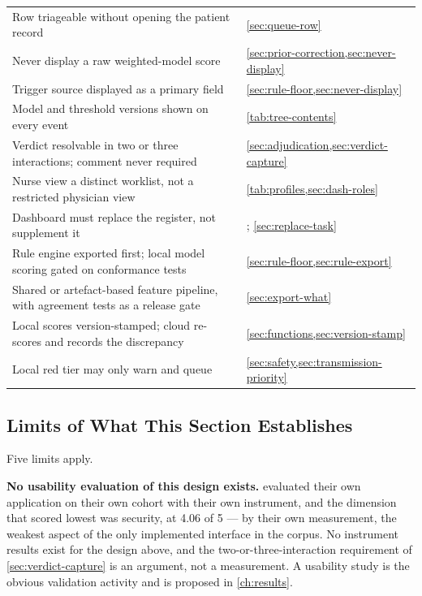 \documentclass[12pt,a4paper,oneside]{report}
\begin{document}
\begin{table}[htbp]
\begin{tabularx}{\textwidth}{@{}X >{\raggedright\arraybackslash}p{4.8cm}@{}}
Row triageable without opening the patient record & \cref{sec:queue-row} \\
Never display a raw weighted-model score & \cref{sec:prior-correction,sec:never-display} \\
Trigger source displayed as a primary field & \cref{sec:rule-floor,sec:never-display} \\
Model and threshold versions shown on every event & \cref{tab:tree-contents} \\
Verdict resolvable in two or three interactions; comment never required & \cref{sec:adjudication,sec:verdict-capture} \\
Nurse view a distinct worklist, not a restricted physician view & \cref{tab:profiles,sec:dash-roles} \\
Dashboard must replace the register, not supplement it & \textcite{dodoo2022}; \cref{sec:replace-task} \\
Rule engine exported first; local model scoring gated on conformance tests & \cref{sec:rule-floor,sec:rule-export} \\
Shared or artefact-based feature pipeline, with agreement tests as a release gate & \cref{sec:export-what} \\
Local scores version-stamped; cloud re-scores and records the discrepancy & \cref{sec:functions,sec:version-stamp} \\
Local red tier may only warn and queue & \cref{sec:safety,sec:transmission-priority} \\
\bottomrule
\end{tabularx}
\end{table}

\subsection{Limits of What This Section Establishes}\label{sec:interface-limits}

Five limits apply.

\textbf{No usability evaluation of this design exists.} \Textcite{efendi2025} evaluated their own application on their own cohort with their own instrument, and the dimension that scored lowest was security, at 4.06 of 5 --- by their own measurement, the weakest aspect of the only implemented interface in the corpus. No instrument results exist for the design above, and the two-or-three-interaction requirement of \cref{sec:verdict-capture} is an argument, not a measurement. A usability study is the obvious validation activity and is proposed in \cref{ch:results}.
\end{document}
